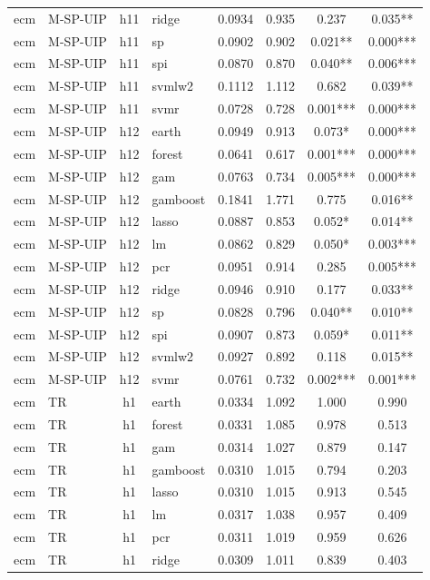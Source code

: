 \begin{ThreePartTable}
\begin{longtable}[t]{llclcccc}
ecm & M-SP-UIP & h11 & ridge & 0.0934 & 0.935 & 0.237 & 0.035**\\
ecm & M-SP-UIP & h11 & sp & 0.0902 & 0.902 & 0.021** & 0.000***\\
ecm & M-SP-UIP & h11 & spi & 0.0870 & 0.870 & 0.040** & 0.006***\\
ecm & M-SP-UIP & h11 & svmlw2 & 0.1112 & 1.112 & 0.682 & 0.039**\\
ecm & M-SP-UIP & h11 & svmr & 0.0728 & 0.728 & 0.001*** & 0.000***\\
\addlinespace
ecm & M-SP-UIP & h12 & earth & 0.0949 & 0.913 & 0.073* & 0.000***\\
ecm & M-SP-UIP & h12 & forest & 0.0641 & 0.617 & 0.001*** & 0.000***\\
ecm & M-SP-UIP & h12 & gam & 0.0763 & 0.734 & 0.005*** & 0.000***\\
ecm & M-SP-UIP & h12 & gamboost & 0.1841 & 1.771 & 0.775 & 0.016**\\
ecm & M-SP-UIP & h12 & lasso & 0.0887 & 0.853 & 0.052* & 0.014**\\
ecm & M-SP-UIP & h12 & lm & 0.0862 & 0.829 & 0.050* & 0.003***\\
ecm & M-SP-UIP & h12 & pcr & 0.0951 & 0.914 & 0.285 & 0.005***\\
ecm & M-SP-UIP & h12 & ridge & 0.0946 & 0.910 & 0.177 & 0.033**\\
ecm & M-SP-UIP & h12 & sp & 0.0828 & 0.796 & 0.040** & 0.010**\\
ecm & M-SP-UIP & h12 & spi & 0.0907 & 0.873 & 0.059* & 0.011**\\
ecm & M-SP-UIP & h12 & svmlw2 & 0.0927 & 0.892 & 0.118 & 0.015**\\
ecm & M-SP-UIP & h12 & svmr & 0.0761 & 0.732 & 0.002*** & 0.001***\\
\addlinespace
ecm & TR & h1 & earth & 0.0334 & 1.092 & 1.000 & 0.990\\
ecm & TR & h1 & forest & 0.0331 & 1.085 & 0.978 & 0.513\\
ecm & TR & h1 & gam & 0.0314 & 1.027 & 0.879 & 0.147\\
ecm & TR & h1 & gamboost & 0.0310 & 1.015 & 0.794 & 0.203\\
ecm & TR & h1 & lasso & 0.0310 & 1.015 & 0.913 & 0.545\\
ecm & TR & h1 & lm & 0.0317 & 1.038 & 0.957 & 0.409\\
ecm & TR & h1 & pcr & 0.0311 & 1.019 & 0.959 & 0.626\\
ecm & TR & h1 & ridge & 0.0309 & 1.011 & 0.839 & 0.403\\

\end{longtable}
\end{ThreePartTable}
